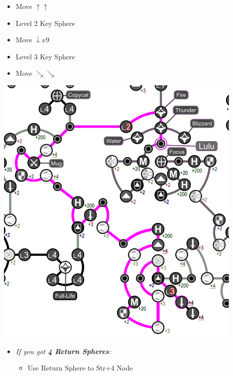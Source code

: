 \begin{spheregrid}
    \begin{multicols}{2}
        \begin{itemize}
            \luluf
            \begin{itemize}
                \item Move $\uparrow\uparrow$
                \item Level 2 Key Sphere
                \item Move $\downarrow x9$
                \item Level 3 Key Sphere
                \item Move $\searrow\searrow$
            \end{itemize}
            \includegraphics[width=.75\columnwidth]{graphics/lulu_grid}
            \yunaf
            \begin{itemize}
                \item \textit{If you got \textbf{4 Return Spheres}:}
                    \begin{itemize}
                        \item Use Return Sphere to Str+4 Node
\end{itemize}
\end{itemize}
\end{itemize}
\end{multicols}
\end{spheregrid}
